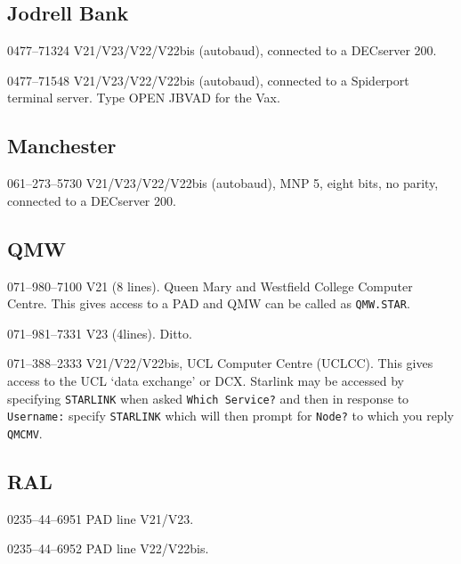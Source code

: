 \subsection{Jodrell Bank}
\begin{list}{}{\setlength{\labelwidth}{\numlen}\setlength{\leftmargin}{\numlen}
\addtolength{\leftmargin}{\labelsep}}
\item[0477--71324] V21/V23/V22/V22bis (autobaud), connected to a DECserver
200.
\item[0477--71548] V21/V23/V22/V22bis (autobaud), connected to a Spiderport
terminal server. Type OPEN JBVAD for the Vax.
\end{list}

\subsection{Manchester}
\begin{list}{}{\setlength{\labelwidth}{\numlen}\setlength{\leftmargin}{\numlen}
\addtolength{\leftmargin}{\labelsep}}
\item[061--273--5730] V21/V23/V22/V22bis (autobaud), MNP 5, eight bits, 
no parity, connected to a DECserver 200.
\end{list}

\subsection{QMW}
\begin{list}{}{\setlength{\labelwidth}{\numlen}\setlength{\leftmargin}{\numlen}
\addtolength{\leftmargin}{\labelsep}}
\item[071--980--7100] V21 (8 lines). Queen Mary and Westfield College Computer
Centre. This gives access to a PAD and QMW can be called as {\tt QMW.STAR}.
\item[071--981--7331] V23 (4lines). Ditto.
\item[071--388--2333] V21/V22/V22bis, UCL Computer Centre (UCLCC). This
gives access to the UCL `data exchange' or DCX. Starlink may be accessed by
specifying {\tt STARLINK} when asked {\tt Which Service?} and then in
response to {\tt Username:} specify {\tt STARLINK} which will then prompt
for {\tt Node?} to which you reply {\tt QMCMV}.
\end{list}

\subsection{RAL}
\begin{list}{}{\setlength{\labelwidth}{\numlen}\setlength{\leftmargin}{\numlen}
\addtolength{\leftmargin}{\labelsep}}
\item[0235--44--6951] PAD line V21/V23.
\item[0235--44--6952] PAD line V22/V22bis.
\end{list}

